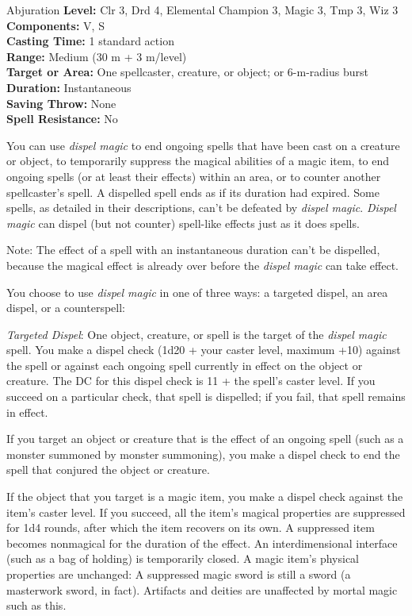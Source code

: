 {Abjuration}
{
	\textbf{Level:}
	Clr 3, Drd 4, Elemental Champion 3, Magic 3, Tmp 3, Wiz 3\\
	\textbf{Components:}
	V, S\\
	\textbf{Casting Time:}
	1 standard action\\
	\textbf{Range:}
	Medium (30 m + 3 m/level)\\
	\textbf{Target or Area:}
	One spellcaster, creature, or object; or 6-m-radius burst\\
	\textbf{Duration:}
	Instantaneous\\
	\textbf{Saving Throw:}
	None\\
	\textbf{Spell Resistance:}
	No\\
}
{
	You can use \emph{dispel magic} to end ongoing spells that have been cast on a creature or object, to temporarily suppress the magical abilities of a magic item, to end ongoing spells (or at least their effects) within an area, or to counter another spellcaster's spell. A dispelled spell ends as if its duration had expired. Some spells, as detailed in their descriptions, can't be defeated by \emph{dispel magic}. \emph{Dispel magic} can dispel (but not counter) spell-like effects just as it does spells.

	Note: The effect of a spell with an instantaneous duration can't be dispelled, because the magical effect is already over before the \emph{dispel magic} can take effect.

	You choose to use \emph{dispel magic} in one of three ways: a targeted dispel, an area dispel, or a counterspell:

	\textit{Targeted Dispel}:
	One object, creature, or spell is the target of the \emph{dispel magic} spell. You make a dispel check (1d20 + your caster level, maximum +10) against the spell or against each ongoing spell currently in effect on the object or creature. The DC for this dispel check is 11 + the spell's caster level. If you succeed on a particular check, that spell is dispelled; if you fail, that spell remains in effect.

	If you target an object or creature that is the effect of an ongoing spell (such as a monster summoned by monster summoning), you make a dispel check to end the spell that conjured the object or creature.

	If the object that you target is a magic item, you make a dispel check against the item's caster level. If you succeed, all the item's magical properties are suppressed for 1d4 rounds, after which the item recovers on its own. A suppressed item becomes nonmagical for the duration of the effect. An interdimensional interface (such as a bag of holding) is temporarily closed. A magic item's physical properties are unchanged: A suppressed magic sword is still a sword (a masterwork sword, in fact). Artifacts and deities are unaffected by mortal magic such as this.

}
